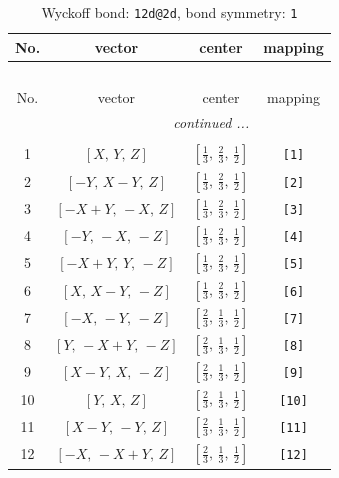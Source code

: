 \documentclass[fleqn,8pt]{jsarticle}
\begin{document}
\begin{longtable}{cccc}
\caption{Wyckoff bond: {\tt 12d@2d}, bond symmetry: {\tt 1}}
 \\
 \hline \hline
No. & vector & center & mapping \\ \hline \endfirsthead

\multicolumn{3}{l}{\tablename\ \thetable{}} \\
 \hline \hline
No. & vector & center & mapping \\ \hline \endhead

 \hline \hline
\multicolumn{3}{r}{\footnotesize\it continued ...} \\ \endfoot

 \hline \hline
\multicolumn{3}{r}{} \\ \endlastfoot

1 & $\left[ X,\, Y,\, Z \right]$ & $\left[ \frac{1}{3},\, \frac{2}{3},\, \frac{1}{2} \right]$ & {\tt [1]} \\ \hline
2 & $\left[ - Y,\, X - Y,\, Z \right]$ & $\left[ \frac{1}{3},\, \frac{2}{3},\, \frac{1}{2} \right]$ & {\tt [2]} \\ \hline
3 & $\left[ - X + Y,\, - X,\, Z \right]$ & $\left[ \frac{1}{3},\, \frac{2}{3},\, \frac{1}{2} \right]$ & {\tt [3]} \\ \hline
4 & $\left[ - Y,\, - X,\, - Z \right]$ & $\left[ \frac{1}{3},\, \frac{2}{3},\, \frac{1}{2} \right]$ & {\tt [4]} \\ \hline
5 & $\left[ - X + Y,\, Y,\, - Z \right]$ & $\left[ \frac{1}{3},\, \frac{2}{3},\, \frac{1}{2} \right]$ & {\tt [5]} \\ \hline
6 & $\left[ X,\, X - Y,\, - Z \right]$ & $\left[ \frac{1}{3},\, \frac{2}{3},\, \frac{1}{2} \right]$ & {\tt [6]} \\ \hline
7 & $\left[ - X,\, - Y,\, - Z \right]$ & $\left[ \frac{2}{3},\, \frac{1}{3},\, \frac{1}{2} \right]$ & {\tt [7]} \\ \hline
8 & $\left[ Y,\, - X + Y,\, - Z \right]$ & $\left[ \frac{2}{3},\, \frac{1}{3},\, \frac{1}{2} \right]$ & {\tt [8]} \\ \hline
9 & $\left[ X - Y,\, X,\, - Z \right]$ & $\left[ \frac{2}{3},\, \frac{1}{3},\, \frac{1}{2} \right]$ & {\tt [9]} \\ \hline
10 & $\left[ Y,\, X,\, Z \right]$ & $\left[ \frac{2}{3},\, \frac{1}{3},\, \frac{1}{2} \right]$ & {\tt [10]} \\ \hline
11 & $\left[ X - Y,\, - Y,\, Z \right]$ & $\left[ \frac{2}{3},\, \frac{1}{3},\, \frac{1}{2} \right]$ & {\tt [11]} \\ \hline
12 & $\left[ - X,\, - X + Y,\, Z \right]$ & $\left[ \frac{2}{3},\, \frac{1}{3},\, \frac{1}{2} \right]$ & {\tt [12]} \\
\end{longtable}
\end{document}
